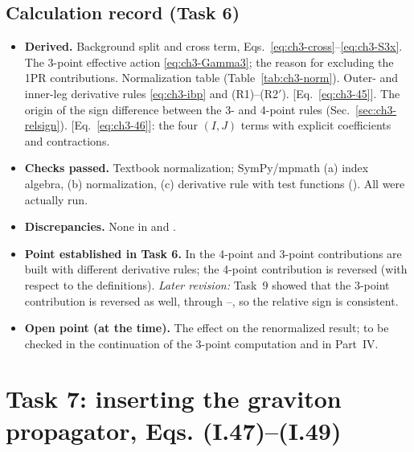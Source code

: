 \subsection{Calculation record (Task 6)}
\begin{itemize}[leftmargin=14pt]
\item \textbf{Derived.} Background split and cross term, Eqs.~\eqref{eq:ch3-cross}--\eqref{eq:ch3-S3x}.
The 3-point effective action \eqref{eq:ch3-Gamma3}; the reason for excluding the 1PR contributions.
Normalization table (Table~\ref{tab:ch3-norm}). Outer- and inner-leg derivative rules \eqref{eq:ch3-ibp} and (R1)--(R2$'$).
 [Eq.~\eqref{eq:ch3-45}]. The origin of the sign difference between the 3- and 4-point rules (Sec.~\ref{sec:ch3-relsign}).
 [Eq.~\eqref{eq:ch3-46}]: the four $(I,J)$ terms with explicit coefficients and contractions.
\item \textbf{Checks passed.} Textbook normalization; SymPy/mpmath (a) index algebra, (b) normalization, (c) derivative rule with test
functions (). All were actually run.
\item \textbf{Discrepancies.} None in  and .
\item \textbf{Point established in Task 6.} In \PI{} the 4-point and 3-point contributions are built with different derivative rules; the 4-point
contribution is reversed (with respect to the definitions). \emph{Later revision:} Task~9 showed that the 3-point contribution is reversed as well,
through --, so the relative sign is consistent.
\item \textbf{Open point (at the time).} The effect on the renormalized result; to be checked in the continuation of the 3-point computation and in Part~IV.
\end{itemize}

\section{Task 7: inserting the graviton propagator, Eqs. (I.47)--(I.49)}
\label{sec:ch3-task7}

